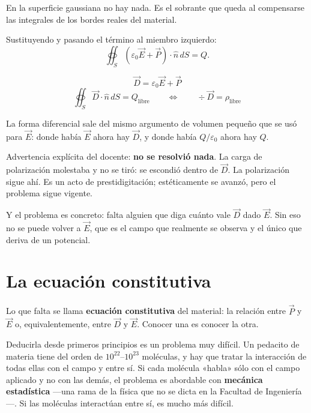 \documentclass[12pt,a4paper]{article}
\begin{document}
\begin{notebox}
En la superficie gaussiana no hay nada. Es el sobrante que queda al compensarse
las integrales de los bordes reales del material.
\end{notebox}

Sustituyendo y pasando el término al miembro izquierdo:
\[
\oiint_S \left(\varepsilon_0 \vec E + \vec P\right)\cdot \hat n \, dS = Q .
\]

\begin{keybox}
\[
\boxed{\ \vec D = \varepsilon_0 \vec E + \vec P \ }
\]
\[
\boxed{\ \oiint_S \vec D \cdot \hat n \, dS = Q_{\text{libre}}
\qquad\Longleftrightarrow\qquad
\div \vec D = \rho_{\text{libre}} \ }
\]
\end{keybox}

La forma diferencial sale del mismo argumento de volumen pequeño que se usó para
$\vec E$: donde había $\vec E$ ahora hay $\vec D$, y donde había
$Q/\varepsilon_0$ ahora hay $Q$.

\begin{warnbox}
Advertencia explícita del docente: \textbf{no se resolvió nada}. La carga de
polarización molestaba y no se tiró: se escondió dentro de $\vec D$. La
polarización sigue ahí. Es un acto de prestidigitación; estéticamente se avanzó,
pero el problema sigue vigente.
\end{warnbox}

Y el problema es concreto: falta alguien que diga cuánto vale $\vec D$ dado
$\vec E$. Sin eso no se puede volver a $\vec E$, que es el campo que realmente se
observa y el único que deriva de un potencial.

\section{La ecuación constitutiva}

Lo que falta se llama \textbf{ecuación constitutiva} del material: la relación
entre $\vec P$ y $\vec E$ o, equivalentemente, entre $\vec D$ y $\vec E$. Conocer
una es conocer la otra.

Deducirla desde primeros principios es un problema muy difícil. Un pedacito de
materia tiene del orden de $10^{22}$--$10^{23}$ moléculas, y hay que tratar la
interacción de todas ellas con el campo y entre sí. Si cada molécula «habla» sólo
con el campo aplicado y no con las demás, el problema es abordable con
\textbf{mecánica estadística} ---una rama de la física que no se dicta en la
Facultad de Ingeniería---. Si las moléculas interactúan entre sí, es mucho más
difícil.
\end{document}
